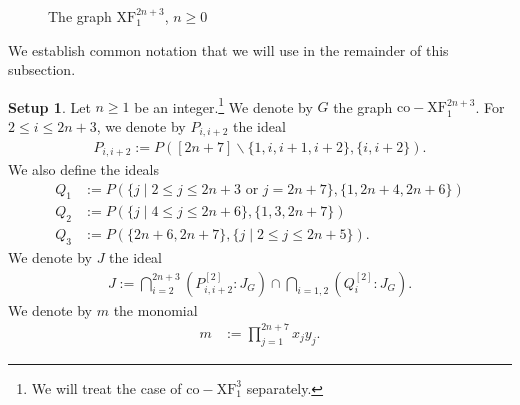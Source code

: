 \documentclass[12pt,a4paper]{amsart}
\theoremstyle{plain}
\theoremstyle{definition}
\newtheorem{setup}[thrm]{Setup}
\theoremstyle{remark}
\let\setminus=\smallsetminus
\begin{document}
\def\ptsJn{0*\edJn/-1*\edJn/1/270,
    .781831*\edJn/-.62349*\edJn/2/0,
    .974928*\edJn/.222521*\edJn/3/0,
    .433884*\edJn/.900969*\edJn/4/0,
   -.974928*\edJn/.222521*\edJn/2n+4/180,
    -.781831*\edJn/-.62349*\edJn/2n+5/180,
    2*.781831*\edJn/2*-.62349*\edJn/2n+7/0,
    2*-.781831*\edJn/2*-.62349*\edJn/2n+6/180}
    
\def\ptsJnUnlabel{-.433884*\edJn/.900969*\edJn/5}

\def\edgesJn{
    1/2,
    1/3,
    1/4,
    1/5,
    1/2n+4,
    1/2n+5,
    2/3,
    3/4,
    2n+4/5,
    2n+4/2n+5,
    2n+5/2n+6,
    2/2n+7}

\begin{figure}[htb]
\begin{center}
\end{center}
\caption{The graph $\mathrm{XF}_1^{2n+3}$, $n\geq 0$} \label{graph:Jn}
\end{figure}

We establish common notation that we will use in the remainder of this subsection.

\begin{setup}
\label{setup:Jn}
Let $n \ge 1$ be an integer.\footnote{We will treat the case of $\mathrm{co\!-\!XF}_{1}^{3}$ separately.} We denote by $G$ the graph $\mathrm{co\!-\!XF}_1^{2n+3}$. For $2 \leq i \leq 2n+3$, we denote by $P_{i,i+2}$ the ideal
\begin{align*}
    P_{i,i+2} := P([2n+7]\setminus\{1,i,i+1,i+2\},\{i,i+2\}).
\end{align*}
We also define the ideals
\begin{align*}
Q_{1} &:= P(\{ j \mid 2 \leq j \leq 2n+3 \text{ or } j = 2n+7 \}, \{1,2n+4,2n+6\}) \\
Q_{2} &:= P( \{j \mid 4 \leq j \leq 2n+6 \}, \{1,3,2n+7\} ) \\
Q_{3} &:= P(\{2n+6,2n+7\}, \{j \mid 2 \leq j \leq 2n+5 \} ).
\end{align*}
We denote by $J$ the ideal 
\begin{align*}
    J := \bigcap_{i=2}^{2n+3} \left( P_{i,i+2}^{[2]}:J_{G} \right) \cap \bigcap_{i=1,2} \left( Q_{i}^{[2]}:J_{G} \right).
\end{align*}
We denote by $m$ the monomial
\begin{align*}
    m &:= \prod_{j=1}^{2n+7} x_{j}y_{j}.
\end{align*}
\end{setup}
\end{document}
